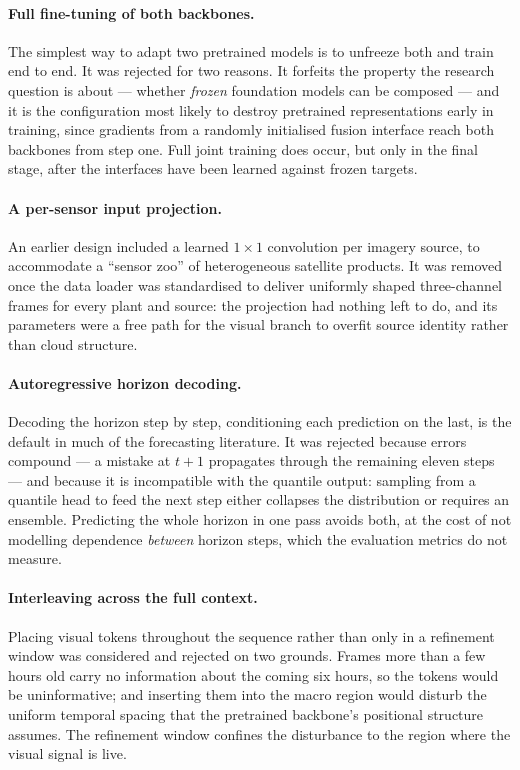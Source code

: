 \paragraph{Full fine-tuning of both backbones.} The simplest way to adapt two pretrained
models is to unfreeze both and train end to end. It was rejected for two reasons. It forfeits
the property the research question is about --- whether \emph{frozen} foundation models can
be composed --- and it is the configuration most likely to destroy pretrained representations
early in training, since gradients from a randomly initialised fusion interface reach both
backbones from step one. Full joint training does occur, but only in the final stage, after
the interfaces have been learned against frozen targets.

\paragraph{A per-sensor input projection.} An earlier design included a learned $1\times1$
convolution per imagery source, to accommodate a ``sensor zoo'' of heterogeneous satellite
products. It was removed once the data loader was standardised to deliver uniformly shaped
three-channel frames for every plant and source: the projection had nothing left to do, and
its parameters were a free path for the visual branch to overfit source identity rather than
cloud structure.

\paragraph{Autoregressive horizon decoding.} Decoding the horizon step by step, conditioning
each prediction on the last, is the default in much of the forecasting literature. It was
rejected because errors compound --- a mistake at $t{+}1$ propagates through the remaining
eleven steps --- and because it is incompatible with the quantile output: sampling from a
quantile head to feed the next step either collapses the distribution or requires an
ensemble. Predicting the whole horizon in one pass avoids both, at the cost of not modelling
dependence \emph{between} horizon steps, which the evaluation metrics do not measure.

\paragraph{Interleaving across the full context.} Placing visual tokens throughout the
sequence rather than only in a refinement window was considered and rejected on two grounds.
Frames more than a few hours old carry no information about the coming six hours, so the
tokens would be uninformative; and inserting them into the macro region would disturb the
uniform temporal spacing that the pretrained backbone's positional structure assumes. The
refinement window confines the disturbance to the region where the visual signal is live.

